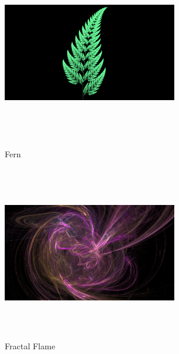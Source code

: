 \begin{figure}[htbp]
  \begin{minipage}{0.49\hsize}
   \center
   \includegraphics[width=3in, height=3in, keepaspectratio]{../img/fractal/fern.pdf}
   \caption{Fern}
   \label{fig:fern}
 \end{minipage}
 \begin{minipage}{0.49\hsize}
  \center
  \includegraphics[width=3in, height=3in, keepaspectratio]{../img/fractal/fractalFlame.pdf}
  \caption{Fractal Flame}
  \label{fig:fractalFlame}
 \end{minipage}
\end{figure}

\clearpage
